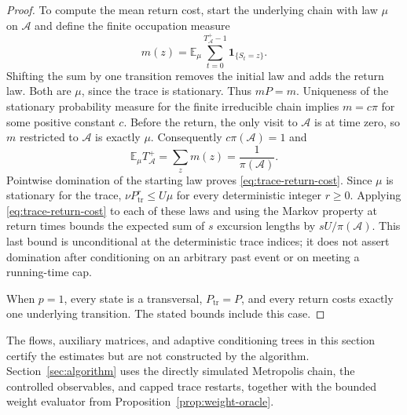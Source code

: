 \begin{proof}
To compute the mean return cost, start the underlying chain with law
$\mu$ on $\mathcal A$ and define the finite occupation measure
\[
  m(z)=\mathbb E_\mu
       \sum_{t=0}^{T_{\mathcal A}^+-1}\mathbf 1_{\{S_t=z\}}.
\]
Shifting the sum by one transition removes the initial law and adds
the return law. Both are $\mu$, since the trace is stationary.
Thus $mP=m$. Uniqueness of the stationary probability measure for
the finite irreducible chain implies $m=c\pi$ for some positive
constant $c$. Before the return, the only visit to $\mathcal A$ is at
time zero, so $m$ restricted to $\mathcal A$ is exactly $\mu$.
Consequently $c\pi(\mathcal A)=1$ and
\[
  \mathbb E_\mu T_{\mathcal A}^+
   =\sum_zm(z)=\frac{1}{\pi(\mathcal A)}.
\]
Pointwise domination of the starting law proves
\eqref{eq:trace-return-cost}.
Since $\mu$ is stationary for the trace,
$\nu P_{\mathrm{tr}}^r\leq U\mu$ for every deterministic integer
$r\geq0$. Applying \eqref{eq:trace-return-cost} to each of these
laws and using the Markov property at return times bounds the
expected sum of $s$ excursion lengths by $sU/\pi(\mathcal A)$.
This last bound is unconditional at the deterministic trace indices;
it does not assert domination after conditioning on an arbitrary
past event or on meeting a running-time cap.

When $p=1$, every state is a transversal, $P_{\mathrm{tr}}=P$, and
every return costs exactly one underlying transition. The stated
bounds include this case.
\end{proof}

The flows, auxiliary matrices, and adaptive conditioning trees in
this section certify the estimates but are not constructed by the
algorithm. Section~\ref{sec:algorithm} uses the directly simulated
Metropolis chain, the controlled observables, and capped trace
restarts, together with the bounded weight evaluator from
Proposition~\ref{prop:weight-oracle}.

